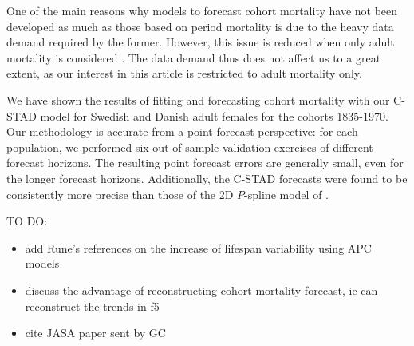\documentclass[11pt, a4paper]{article}
\begin{document}
One of the main reasons why models to forecast cohort mortality have not been developed as much as those based on period mortality is due to the heavy data demand required by the former. However, this issue is reduced when only adult mortality is considered \citep{booth2006demographic}. The data demand thus does not affect us to a great extent, as our interest in this article is restricted to adult mortality only. 

We have shown the results of fitting and forecasting cohort mortality with our C-STAD model for Swedish and Danish adult females for the cohorts 1835-1970. Our methodology is accurate from a point forecast perspective: for each population, we performed six out-of-sample validation exercises of different forecast horizons. The resulting point forecast errors are generally small, even for the longer forecast horizons. Additionally, the C-STAD forecasts were found to be consistently more precise than those of the 2D $P$-spline model of \cite{currie2004smoothing}.





\bigskip

\noindent 
TO DO:
\begin{itemize}
	\item add Rune's references on the increase of lifespan variability using APC models
	\item discuss the advantage of reconstructing cohort mortality forecast, ie can reconstruct the trends in f5
	\item cite JASA paper sent by GC
\end{itemize}
\end{document}
